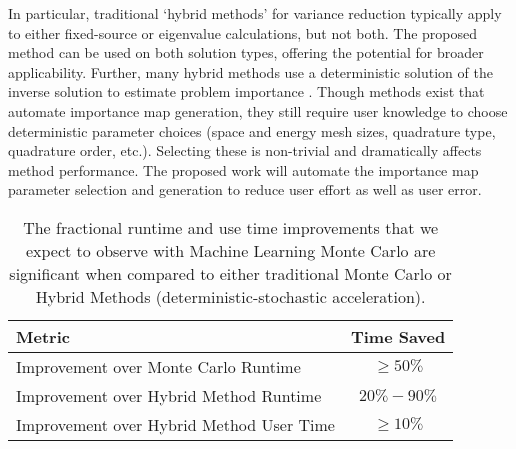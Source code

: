 \documentclass[letterpaper,12pt]{article}
\begin{document}
In particular, traditional `hybrid methods' for variance 
reduction typically apply to either fixed-source or eigenvalue calculations, but not both.
The proposed method can be used on both solution types, offering the potential for
broader applicability. Further, many hybrid
methods use a deterministic solution of the inverse solution to estimate problem
importance\cite{wagner_automated_1998, wagner_automated_2009,
haghighat_monte_2003, zhang_adjoint-based_2011, hoogenboom_optimum_1979} . Though methods exist that automate importance map
generation\cite{hendricks_mcnp_1985, burn_optimizing_2014,
  van_wijk_easy_2011, wagner_automated_1998, wagner_automated_2009,
haghighat_monte_2003, zhang_adjoint-based_2011, hoogenboom_optimum_1979},
they still require user knowledge to choose deterministic
parameter choices (space and energy mesh sizes, quadrature type, quadrature order,
etc.). Selecting these is non-trivial and dramatically affects method 
performance. The proposed work will automate the importance map parameter selection
and generation to reduce user effort as well as user error.

\begin{table}
  \centering
    \begin{tabular}{  l  c  }
     \hline
     \textbf{Metric} & \textbf{Time Saved}\\ \hline
     Improvement over Monte Carlo Runtime & $\ge50\%$  \\
     Improvement over Hybrid Method Runtime & $20\%-90\%$ \\
     Improvement over Hybrid Method User Time & $\ge10\%$ \\
     \hline
    \end{tabular}
    \caption{The fractional runtime and use time improvements that we expect  to observe with Machine 
            Learning Monte Carlo are significant when compared to either 
            traditional Monte Carlo or Hybrid Methods (deterministic-stochastic 
            acceleration).}
   \label{tab:improve}
\end{table}
\end{document}
